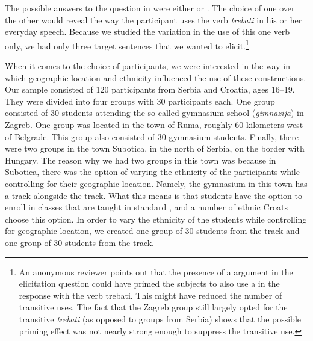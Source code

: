 \documentclass[output=paper,modfonts,newtxmath,hidelinks,]{langscibook}
\begin{document}
\ea \label{7:ex7}
	\z
\z

\noindent The possible answers to the question in  were either  or . The choice of one over the other would reveal the way the participant uses the verb \textit{trebati} in his or her everyday speech. Because we studied the variation in the use of this one verb only, we had only three target sentences that we wanted to elicit.\footnote{\label{7:fn2}An anonymous reviewer points out that the presence of a  argument in the elicitation question could have primed the subjects to also use a  in the response with the verb trebati. This might have reduced the number of transitive uses. The fact that the Zagreb group still largely opted for the transitive \textit{trebati} (as opposed to groups from Serbia) shows that the possible priming effect was not nearly strong enough to suppress the transitive use.}

When it comes to the choice of participants, we were interested in the way in which geographic location and ethnicity influenced the use of these constructions. Our sample consisted of 120 participants from Serbia and Croatia, ages 16--19. They were divided into four groups with 30 participants each. One group consisted of 30 students attending the so-called gymnasium school (\textit{gimnazija}) in Zagreb. One group was located in the town of Ruma, roughly 60 kilometers west of Belgrade. This group also consisted of 30 gymnasium students. Finally, there were two groups in the town Subotica, in the north of Serbia, on the border with Hungary. The reason why we had two groups in this town was because in Subotica, there was the option of varying the ethnicity of the participants while controlling for their geographic location. Namely, the gymnasium in this town has a  track alongside the  track. What this means is that students have the option to enroll in classes that are taught in standard , and a number of ethnic Croats choose this option. In order to vary the ethnicity of the students while controlling for geographic location, we created one group of 30 students from the  track and one group of 30 students from the  track. 
\end{document}

